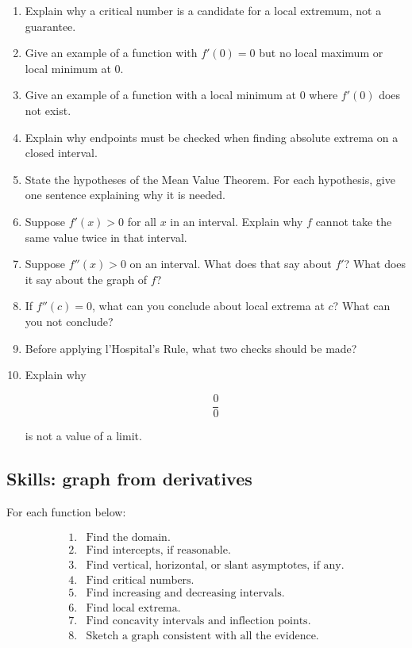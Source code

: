 \begin{enumerate}
\item Explain why a critical number is a candidate for a local extremum, not a
guarantee.

\item Give an example of a function with \(f'(0)=0\) but no local maximum or local
minimum at \(0\).

\item Give an example of a function with a local minimum at \(0\) where \(f'(0)\) does
not exist.

\item Explain why endpoints must be checked when finding absolute extrema on a
closed interval.

\item State the hypotheses of the Mean Value Theorem.  For each hypothesis, give one
sentence explaining why it is needed.

\item Suppose \(f'(x)>0\) for all \(x\) in an interval.  Explain why \(f\) cannot take the
same value twice in that interval.

\item Suppose \(f''(x)>0\) on an interval.  What does that say about \(f'\)?  What does
it say about the graph of \(f\)?

\item If \(f''(c)=0\), what can you conclude about local extrema at \(c\)?  What can you
not conclude?

\item Before applying l'Hospital's Rule, what two checks should be made?

\item Explain why

\[
\frac00
\]

is not a value of a limit.
\end{enumerate}

\subsection{Skills: graph from derivatives}
\label{subsec:skills-graph-from-derivatives}

For each function below:

\[
\begin{array}{ll}
\text{1.} & \text{Find the domain.}\\
\text{2.} & \text{Find intercepts, if reasonable.}\\
\text{3.} & \text{Find vertical, horizontal, or slant asymptotes, if any.}\\
\text{4.} & \text{Find critical numbers.}\\
\text{5.} & \text{Find increasing and decreasing intervals.}\\
\text{6.} & \text{Find local extrema.}\\
\text{7.} & \text{Find concavity intervals and inflection points.}\\
\text{8.} & \text{Sketch a graph consistent with all the evidence.}
\end{array}
\]

